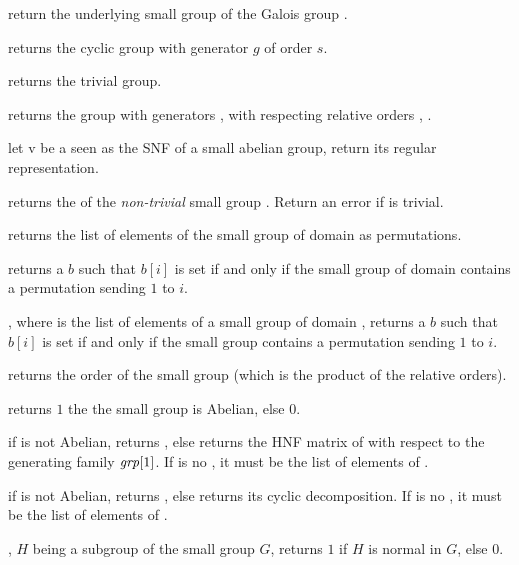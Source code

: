  return the underlying small group of the
Galois group .

 returns the cyclic group with generator
$g$ of order $s$.

 returns the trivial group.

 returns the group
with generators ,  with respecting relative orders ,
.

 let v be a  seen as the SNF of
a small abelian group, return its regular representation.

 returns the  of the
\emph{non-trivial} small group . Return an error if  is
trivial.

 returns the list of elements of the
small group  of domain  as permutations.

 returns a  $b$ such that
$b[i]$ is set if and only if the small group  of domain 
contains a permutation sending $1$ to $i$.

, where  is the list of
elements of a small group of domain , returns a  $b$ such that
$b[i]$ is set if and only if the small group contains a permutation sending $1$
to $i$.

 returns the order of the small group
 (which is the product of the relative orders).

 returns $1$ the the small group
 is Abelian, else $0$.

 if  is not Abelian,
returns , else returns the HNF matrix of  with respect to
the generating family $\hbox{\it grp\/}[1]$. If  is no , it must
be the list of elements of .

 if  is not Abelian,
returns , else returns its cyclic decomposition. If  is no
, it must be the list of elements of .

, $H$ being a subgroup of the
small group $G$, returns $1$ if $H$ is normal in $G$, else $0$.

